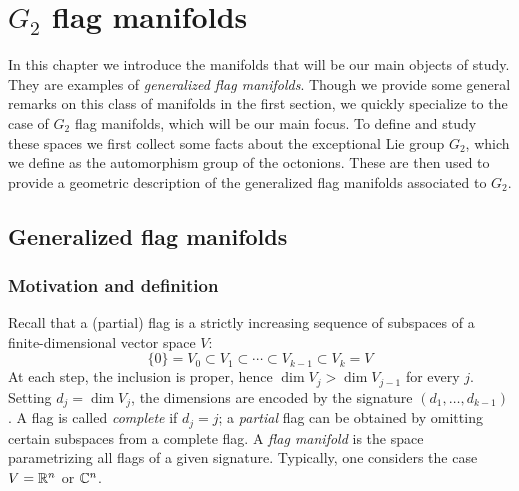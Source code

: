 \chapter{\texorpdfstring{$G_2$}{G2} flag manifolds}
\label{chap:flags}

In this chapter we introduce the manifolds that will be our main objects of study. They are examples of \emph{generalized flag manifolds}. Though we provide some general remarks on this class of manifolds in the first section, we quickly specialize to the case of $G_2$ flag manifolds, which will be our main focus. To define and study these spaces we first collect some facts about the exceptional Lie group $G_2$, which we define as the automorphism group of the octonions. These are then used to provide a geometric description of the generalized flag manifolds associated to $G_2$.


\section{Generalized flag manifolds}
\label{sec:genflags}

\subsection{Motivation and definition}

Recall that a (partial) flag is a strictly increasing sequence of subspaces of a finite-dimensional vector space $V$:
\begin{equation*}
	\{0\}=V_0\subset V_1\subset\cdots \subset V_{k-1}\subset V_k=V
\end{equation*}
At each step, the inclusion is proper, hence $\dim V_j>\dim V_{j-1}$ for every $j$. Setting $d_j=\dim V_j$, the dimensions are encoded by the signature $(d_1,\dots,d_{k-1})$. A flag is called \emph{complete} if $d_j=j$; a \emph{partial} flag can be obtained by omitting certain subspaces from a complete flag. A \emph{flag manifold} is the space parametrizing all flags of a given signature. Typically, one considers the case $V=\mathbb{R}^n$ or $\mathbb{C}^n$.

